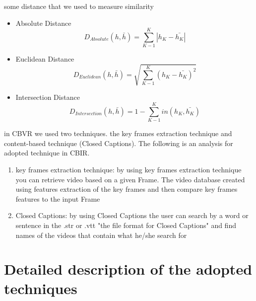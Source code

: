 \documentclass[pdftex,10pt,a4paper,oneside]{article}
\begin{document}
some distance that we used to measure similarity 
\begin{itemize}
	\item Absolute Distance \\
	\begin{equation}
		D_{Absolute}(h,\bar{h})= \sum_{K-1}^{K} |h_{K}-\bar{h_{K}}|
	\end{equation}
	\item Euclidean Distance \\
	\begin{equation}
		D_{Euclidean}(h,\bar{h})= \sqrt{\sum_{K-1}^{K} (h_{K}-\bar{h_{K}})^{2}}
	\end{equation}
	\item Intersection Distance \\
	\begin{equation}
	D_{Intersection}(h,\bar{h})= 1- \sum_{K-1}^{K} in(h_{K},\bar{h_{K}})
	\end{equation}
	
	
	
\end{itemize}
in CBVR we used two techniques. the key frames extraction technique and content-based technique (Closed Captions).  The following is an analysis for adopted technique in CBIR.
\begin{enumerate}
	\item key frames extraction technique: by using key frames extraction technique you can retrieve video based on a given Frame. The video database created using features extraction of the key frames and then compare key frames features to the input Frame
	
	\item  Closed Captions: by using Closed Captions the user can search by a word or sentence in the .str or .vtt "the file format for Closed Captions" and find names of the videos that contain what he/she search for
\end{enumerate}

	
	\pagebreak
	\section{Detailed description of the adopted techniques }
\end{document}
